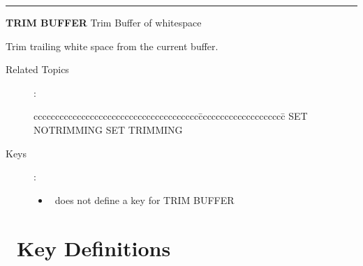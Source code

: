 \goodbreak

\rule{\textwidth}{0.3mm}

{\Large {\bf TRIM BUFFER} \hfill Trim Buffer of whitespace}

\medskip
  Trim trailing white space from the current buffer.

\begin{description}
\item[Related Topics]:
\begin{tabbing}
cccccccccccccccccccccccccccccccccccccc\=cccccccccccccccccccc\=\kill
SET NOTRIMMING \> SET TRIMMING \\
\end{tabbing}

\item[Keys]:
          \begin{itemize}
          \item \STEve\ does not define a key for TRIM BUFFER
          \end{itemize}
\end{description}

\newpage

\section{\STEve\ Key Definitions}
\label{key_defs}

